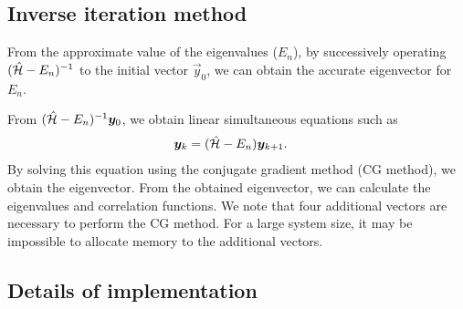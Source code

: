 \subsection{Inverse iteration method}

From the approximate value of the eigenvalues ($E_{n}$),
by successively operating $(\hat{\mathcal{H}}-E_{n})^{-1}$
to the initial vector $\vec{y}_{0}$,
we can obtain the accurate eigenvector for $E_{n}$.

From $(\hat{\mathcal{H}}-E_{n})^{-1}\boldsymbol y_{0}$,
we obtain linear simultaneous equations such as  
\begin{align}
\boldsymbol y_{k}&=(\hat{\mathcal{H}}-E_{n})\boldsymbol y_{k+1}. \label{eq: TPQVector}
\end{align}
By solving this equation using the
conjugate gradient method (CG method),
we obtain the eigenvector.
From the obtained eigenvector,
we can calculate the eigenvalues and correlation functions. 
We note that four additional vectors are necessary to
perform the CG method.
For a large system size,
it may be impossible to allocate memory to the
additional vectors.

\subsection{Details of implementation}
